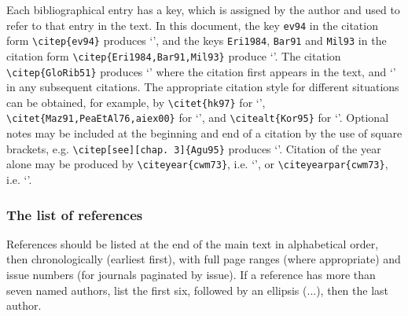 \documentclass{nCSE2e}
\begin{document}
Each bibliographical entry has a key, which is assigned by the author and used to refer to that entry in the text. In this document, the key \verb"ev94" in the citation form \verb"\citep{ev94}" produces `\citep{ev94}', and the keys \verb"Eri1984", \verb"Bar91" and \verb"Mil93" in the citation form \verb"\citep{Eri1984,Bar91,Mil93}" produce `\citep{Eri1984,Mil93,Bar91}'. The citation \verb"\citep{GloRib51}" produces `\citep{GloRib51}' where the citation first appears in the text, and `\citep{GloRib51}' in any subsequent citations. The appropriate citation style for different situations can be obtained, for example, by \verb"\citet{hk97}" for `\citet{hk97}', \verb"\citet{Maz91,PeaEtAl76,aiex00}" for `\citet{Maz91,PeaEtAl76,aiex00}', and \verb"\citealt{Kor95}" for `\citealt{Kor95}'. Optional notes may be included at the beginning and end of a citation by the use of square brackets, e.g. \verb"\citep[see][chap. 3]{Agu95}" produces `\citep[see][chap. 3]{Agu95}'. Citation of the year alone may be produced by \verb"\citeyear{cwm73}", i.e. `\citeyear{cwm73}', or \verb"\citeyearpar{cwm73}", i.e. `\citeyearpar{cwm73}'.


\subsubsection{The list of references}

References should be listed at the end of the main text in alphabetical order, then chronologically (earliest first), with full page ranges (where appropriate) and issue numbers (for journals paginated by issue). If a reference has more than seven named authors, list the first six, followed by an ellipsis (...), then the last author.
\end{document}
